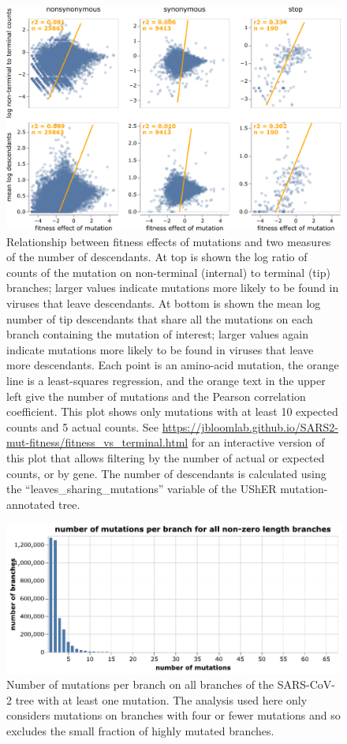 \documentclass[9pt,twocolumn,twoside]{gsajnl_modified}
\begin{document}
\begin{figure}
\centering
\includegraphics[width=0.75\linewidth]{figs/terminal.png}
\caption{
Relationship between fitness effects of mutations and two measures of the number of descendants.
At top is shown the log ratio of counts of the mutation on non-terminal (internal) to terminal (tip) branches; larger values indicate mutations more likely to be found in viruses that leave descendants.
At bottom is shown the mean log number of tip descendants that share all the mutations on each branch containing the mutation of interest; larger values again indicate mutations more likely to be found in viruses that leave more descendants.
Each point is an amino-acid mutation, the orange line is a least-squares regression, and the orange text in the upper left give the number of mutations and the Pearson correlation coefficient.
This plot shows only mutations with at least 10 expected counts and 5 actual counts.
See \url{https://jbloomlab.github.io/SARS2-mut-fitness/fitness_vs_terminal.html} for an interactive version of this plot that allows filtering by the number of actual or expected counts, or by gene.
The number of descendants is calculated using the ``leaves\_sharing\_mutations'' variable of the UShER mutation-annotated tree.
\label{fig:terminal}
}
\end{figure}

\begin{figure}
\centering
\includegraphics[width=0.7\linewidth]{figs/nmut_counts.pdf}
\caption{
Number of mutations per branch on all branches of the SARS-CoV-2 tree with at least one mutation.
The analysis used here only considers mutations on branches with four or fewer mutations and so excludes the small fraction of highly mutated branches.
\label{fig:nmut_counts}
}
\end{figure}
\end{document}
